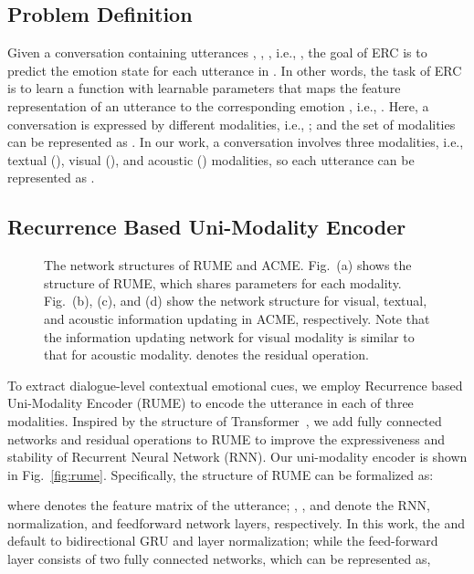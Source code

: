 \documentclass[journal]{IEEEtran}
\begin{document}
\subsection{Problem Definition}
Given a conversation  containing  utterances , , , i.e., , the goal of ERC is to predict the emotion state  for each utterance  in . In other words, the task of ERC is to learn a function  with learnable parameters that maps the feature representation  of an utterance  to the corresponding emotion , i.e., . Here, a conversation is expressed by  different modalities, i.e., ; and the set of modalities can be represented as . In our work, a conversation involves three modalities, i.e., textual (), visual (), and acoustic () modalities, so each utterance  can be represented as .

\subsection{Recurrence Based Uni-Modality Encoder}
\begin{figure*}[htbp]
    \centering
	\hfil
    \hfil
	\hfil
    \caption{The network structures of RUME and ACME. Fig.~(a) shows the structure of RUME, which shares parameters for each modality. Fig.~(b), (c), and (d) show the network structure for visual, textual, and acoustic information updating in ACME, respectively. Note that the information updating network for visual modality is similar to that for acoustic modality.  denotes the residual operation.}
    \label{fig:rume_acme_modal}
\end{figure*}
To extract dialogue-level contextual emotional cues, we employ Recurrence based Uni-Modality Encoder (RUME) to encode the utterance in each of three modalities. Inspired by the structure of Transformer~\cite{vaswani2017attention}, we add fully connected networks and residual operations to RUME to improve the expressiveness and stability of Recurrent Neural Network (RNN). Our uni-modality encoder is shown in Fig.~\ref{fig:rume}. Specifically, the structure of RUME can be formalized as:

where  denotes the feature matrix of the utterance; , , and  denote the RNN, normalization, and feedforward network layers, respectively. In this work, the  and  default to bidirectional GRU and layer normalization; while the feed-forward layer consists of two fully connected networks, which can be represented as,
\end{document}
